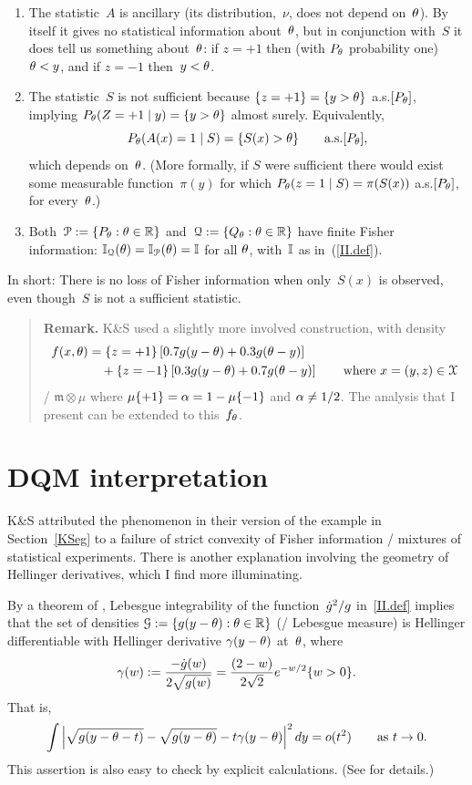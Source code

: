 \documentclass[aos]{imsart}
\def\Leb{{\mathfrak m}}
\theoremstyle{plain}
\theoremstyle{remark}
\newenvironment{remark}{\begin{quote}{\bf Remark.\quad}\rm\small}{\end{quote}}
\def\Remark{\begin{remark}}
\def\endRemark{\end{remark}}
\begin{document}
\begin{enumerate}
\item[(a)] 
The statistic~$A$
is ancillary (its distribution,~$\nu$, does not depend on~$\theta$). By itself it gives no statistical information about~$\theta$, but in conjunction with~$S$ it does tell us something about~$\theta$: if $z=+1$ then (with $P_\theta$ probability one) $\theta<y$, and if $z=-1$ then~$y<\theta$.

\item[(b)]
The statistic~$S$ is not sufficient because $\{z=+1\}=\{y>\theta\}$ a.s.$[P_\theta]$, implying $P_\theta(Z=+1\mid y) = \{y>\theta\}$ almost surely.  Equivalently,
$$
P_\theta(A(x)=1\mid S)=\{S(x)>\theta\}  
\qquad\hbox{\rm a.s.$[P_\theta]$},
$$
which depends on~$\theta$. (More formally, if $S$ were sufficient there would exist some measurable function~$\pi(y)$ for which $P_\theta(z=1\mid S)=\pi(S(x))$ a.s.$[P_\theta]$, for every~$\theta$.)

\item[(c)]
Both~${\EuScript P}:=\{P_\theta:\theta\in{\mathbb R}\}$ and~${\EuScript Q}:=\{Q_\theta:\theta\in{\mathbb R}\}$ have finite Fisher information: ${\mathbb I}_{\EuScript Q}(\theta) = {\mathbb I}_{\EuScript P}(\theta) = {\mathbb I}$ for all $\theta$,
with~${\mathbb I}$ as in~(\ref{II.def}).
\end{enumerate}
\noindent
In short: There is no loss of Fisher information when only~$S(x)$ is observed, even though~$S$ is not a sufficient statistic. 


\Remark 
K\&S used a slightly more involved construction, with density
\begin{align*}
f(x,\theta) &= \{z=+1\}\left[0.7 g(y-\theta) +0.3 g(\theta-y)\right]
\\
&\quad+\{z= - 1\}\left[0.3 g(y-\theta) +0.7 g(\theta-y)\right]
\qquad\hbox{\rm where $x = (y,z)\in{\EuScript X}$}
\end{align*}
\wrt/ $\Leb\otimes \mu$ where $\mu\{+1\}=\alpha = 1-\mu\{-1\}$ and $\alpha\ne 1/2$. The analysis that I present can be extended to this~$f_\theta$.
\endRemark

\section{DQM interpretation}\label{DQM}
K\&S attributed the phenomenon in their version of the example in
Section~\ref{KSeg} to a failure of strict convexity of Fisher
information \wrt/ mixtures of statistical experiments. There is
another explanation involving the geometry of Hellinger derivatives,
which I find more illuminating. 


By a theorem of \citet[Lemma A.3]{Hajek:72berk}, Lebesgue
integrability of the function~${\dot g}^2/g$ in~\cref{II.def} implies that the  set
of densities ${\EuScript G}:=\{g(y-\theta):\theta\in {\mathbb R}\}$ (\wrt/ Lebesgue measure) is Hellinger
differentiable with Hellinger derivative $\gamma(y-\theta)$ at~$\theta$, where
$$
\gamma(w) := \frac{-{\dot g}(w)}{2\sqrt{g(w)}} = \frac{(2-w)}{2\sqrt{2}}e^{-w/2}\{w>0\}  .
$$
That is,
$$
\int\left|\sqrt{g(y-\theta-t)} -\sqrt{g(y-\theta)} - t\gamma(y-\theta)\right|^2dy = o(t^2)
\qquad\hbox{\rm as $t\to 0$}.
$$
This assertion is also easy to check by explicit calculations.
(See \citet[Cor.~12.2.1]{LehmannRomano2005} for details.)
\end{document}
